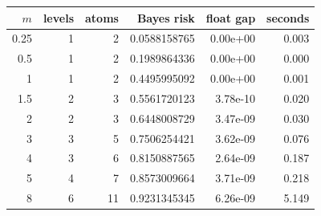 \begin{tabular}{rrrrrr}
\toprule
$m$ & levels & atoms & Bayes risk & float gap & seconds \\
\midrule
0.25 & 1 & 2 & 0.0588158765 & 0.00e+00 & 0.003 \\
0.5 & 1 & 2 & 0.1989864336 & 0.00e+00 & 0.000 \\
1 & 1 & 2 & 0.4495995092 & 0.00e+00 & 0.001 \\
1.5 & 2 & 3 & 0.5561720123 & 3.78e-10 & 0.020 \\
2 & 2 & 3 & 0.6448008729 & 3.47e-09 & 0.030 \\
3 & 3 & 5 & 0.7506254421 & 3.62e-09 & 0.076 \\
4 & 3 & 6 & 0.8150887565 & 2.64e-09 & 0.187 \\
5 & 4 & 7 & 0.8573009664 & 3.71e-09 & 0.218 \\
8 & 6 & 11 & 0.9231345345 & 6.26e-09 & 5.149 \\
\bottomrule
\end{tabular}
